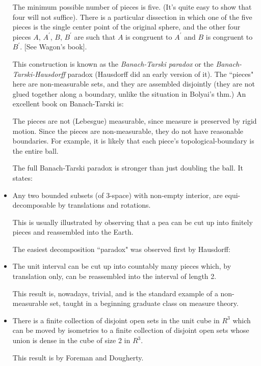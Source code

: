 \begin{itemize}
        The minimum possible number of pieces is five.  (It's quite easy
        to show that four will not suffice).  There is a particular
        dissection in which one of the five pieces is the single center
        point of the original sphere, and the other four pieces  $A$, 
       $A^\prime$, $B$, $B^\prime$  are such that $A$ is congruent to 
       $A^\prime$ and $B$ is congruent to $B^\prime$.
        [See Wagon's book].

        This construction is known as the {\em Banach-Tarski paradox} or the
        {\em Banach-Tarski-Hausdorff} paradox (Hausdorff did an early version
        of it).  The ``pieces" here are non-measurable sets, and they are
        assembled disjointly (they are not glued together along a boundary,
        unlike the situation in Bolyai's thm.)
         An excellent book on Banach-Tarski is:





        The pieces are not (Lebesgue) measurable, since measure is preserved
        by rigid motion. Since the pieces are non-measurable, they do not
        have reasonable boundaries. For example, it is likely that each piece's
        topological-boundary is the entire ball.

        The full Banach-Tarski paradox is stronger than just doubling the
        ball.  It states:

  \item Any two bounded subsets (of 3-space) with non-empty interior, are
        equi-decomposable by translations and rotations.

        This is usually illustrated by observing that a pea can be cut up
        into finitely pieces and reassembled into the Earth.

        The easiest decomposition ``paradox" was observed first by Hausdorff:

    \item The unit interval can be cut up into countably many pieces which,
        by translation only, can be reassembled into the interval of
        length 2.

        This result is, nowadays, trivial, and is the standard example of a
        non-measurable set, taught in a beginning graduate class on measure
        theory.
\item \begin{teo}
 There is a finite collection of disjoint open sets in the unit cube
in $R^3$ which can be moved by isometries to a finite collection of
disjoint open sets whose union is dense in the cube of size 2 in $R^3$.
\end{teo} This result is by Foreman and Dougherty.


\end{itemize}
